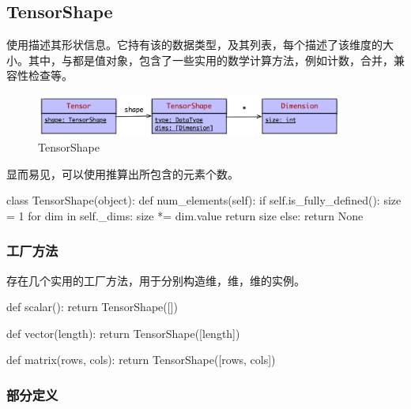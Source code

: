 \begin{content}
\subsection{TensorShape}

使用描述其形状信息。它持有该的数据类型，及其列表，每个描述了该维度的大小。其中，与都是值对象，包含了一些实用的数学计算方法，例如计数，合并，兼容性检查等。

\begin{figure}[H]
\centering
\includegraphics[width=0.9\textwidth]{figures/py-tensor-shape.png}
\caption{TensorShape}
 \label{fig:py-tensor-shape}
\end{figure}

显而易见，可以使用推算出所包含的元素个数。

\begin{leftbar}
\begin{python}
class TensorShape(object):
  def num_elements(self):
    if self.is_fully_defined():
      size = 1
      for dim in self._dims:
        size *= dim.value
      return size
    else:
      return None
\end{python}
\end{leftbar}      

\subsubsection{工厂方法}

存在几个实用的工厂方法，用于分别构造维，维，维的实例。

\begin{leftbar}
\begin{python}
def scalar():
  return TensorShape([])

def vector(length):
  return TensorShape([length])

def matrix(rows, cols):
  return TensorShape([rows, cols])
\end{python}
\end{leftbar}

\subsubsection{部分定义}


\end{content}

